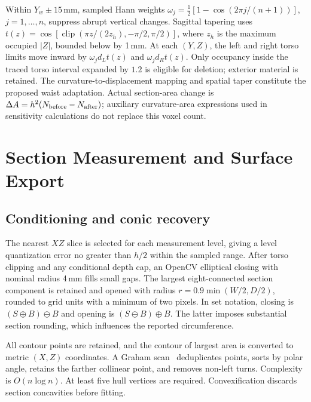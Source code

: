\documentclass[11pt,a4paper]{article}
\newcommand{\clip}{\operatorname{clip}}
\begin{document}
Within $Y_w\pm15$\,mm, sampled Hann weights $\omega_j=\tfrac12[1-\cos(2\pi j/(n+1))]$, $j=1,\ldots,n$, suppress abrupt vertical changes. Sagittal tapering uses $t(z)=\cos[\clip(\pi z/(2z_h),-\pi/2,\pi/2)]$, where $z_h$ is the maximum occupied $|Z|$, bounded below by 1\,mm. At each $(Y,Z)$, the left and right torso limits move inward by $\omega_jd_Lt(z)$ and $\omega_jd_Rt(z)$. Only occupancy inside the traced torso interval expanded by $1.2$ is eligible for deletion; exterior material is retained. The curvature-to-displacement mapping and spatial taper constitute the proposed waist adaptation. Actual section-area change is $\Delta A=h^2(N_{\rm before}-N_{\rm after})$; auxiliary curvature-area expressions used in sensitivity calculations do not replace this voxel count.

\section{Section Measurement and Surface Export}
\subsection{Conditioning and conic recovery}
The nearest $XZ$ slice is selected for each measurement level, giving a level quantization error no greater than $h/2$ within the sampled range. After torso clipping and any conditional depth cap, an OpenCV elliptical closing with nominal radius 4\,mm fills small gaps. The largest eight-connected section component is retained and opened with radius $r=0.9\min(W/2,D/2)$, rounded to grid units with a minimum of two pixels. In set notation, closing is $(S\oplus B)\ominus B$ and opening is $(S\ominus B)\oplus B$. The latter imposes substantial section rounding, which influences the reported circumference.

All contour points are retained, and the contour of largest area is converted to metric $(X,Z)$ coordinates. A Graham scan~\cite{graham1972efficient} deduplicates points, sorts by polar angle, retains the farther collinear point, and removes non-left turns. Complexity is $O(n\log n)$. At least five hull vertices are required. Convexification discards section concavities before fitting.
\end{document}

